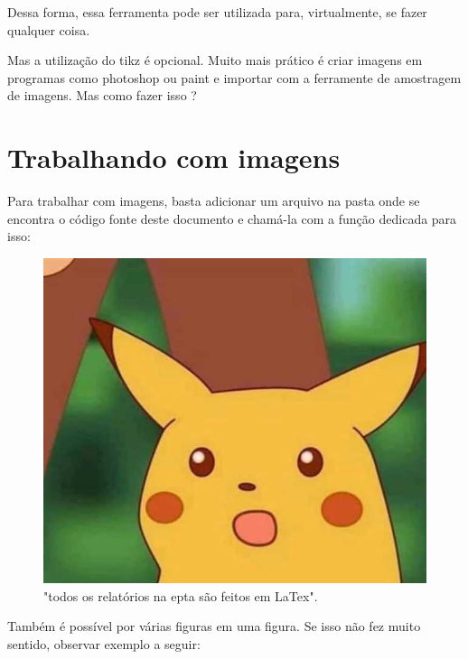 Dessa forma, essa ferramenta pode ser utilizada para, virtualmente, se fazer qualquer coisa.

Mas a utilização do tikz é opcional. Muito mais prático é criar imagens em programas como photoshop ou paint e importar com a ferramente de amostragem de imagens. Mas como fazer isso ?



\chapter{Trabalhando com imagens}



Para trabalhar com imagens, basta adicionar um arquivo na pasta onde se encontra o código fonte deste documento e chamá-la com a função dedicada para isso:


\begin{figure}[h!]
	\centering
	\includegraphics[trim = {0cm 0cm 0cm 0cm}, clip , angle=0, scale=0.30]{midia/exemplo}
	\caption{"todos os relatórios na epta são feitos em LaTex".}
	\label{pika1}
\end{figure}

Também é possível por várias figuras em uma figura. Se isso não fez muito sentido, observar exemplo a seguir:

